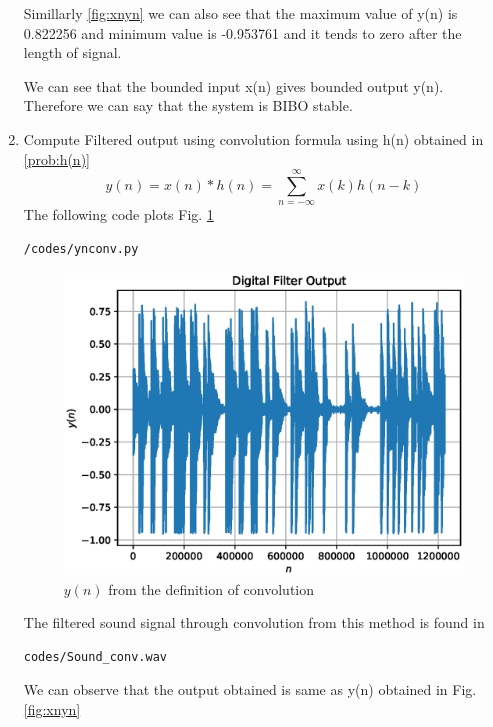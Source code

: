 \documentclass[journal,12pt,twocolumn]{IEEEtran}
\renewcommand\thesection{\arabic{section}}
\begin{document}
\begin{enumerate}[label=\thesection.\arabic*,ref=\thesection.\theenumi]
Simillarly \ref{fig:xnyn} we can also see that the maximum value of y(n) is 0.822256 and minimum value is -0.953761 and it tends to zero after the length of signal.

We can see that the bounded input x(n) gives bounded output
y(n). Therefore we can say that the system is BIBO stable.

\item Compute Filtered output using convolution formula using h(n) obtained in \ref{prob:h(n)}
%
\begin{equation}
\label{eq:convolution}
y(n) = x(n)*h(n) = \sum_{n=-\infty}^{\infty}x(k)h(n-k)
\end{equation}
\solution The following code plots Fig. \ref{fig:yn_conv}
%
\begin{lstlisting}
/codes/ynconv.py
\end{lstlisting}
\begin{figure}[!ht]
\centering
\includegraphics[width=\columnwidth]{./figs/yn_conv}
\caption{$y(n)$ from the definition of convolution}
\label{fig:yn_conv}
\end{figure}
The filtered sound signal through convolution from this method is found in
\begin{lstlisting}
codes/Sound_conv.wav
\end{lstlisting}
We can observe that the output obtained is same as y(n) obtained in Fig. \ref{fig:xnyn}

\end{enumerate}
\end{document}
